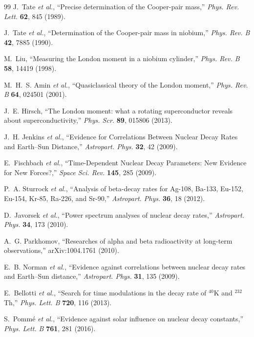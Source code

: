 \documentclass[aps,prb,twocolumn,superscriptaddress,floatfix,nofootinbib,longbibliography]{revtex4-2}
\begin{document}
\begin{thebibliography}{99}
J.~Tate \textit{et al.}, ``Precise determination of the Cooper-pair mass,''
\textit{Phys. Rev. Lett.} \textbf{62}, 845 (1989).

J.~Tate \textit{et al.}, ``Determination of the Cooper-pair mass in niobium,''
\textit{Phys. Rev. B} \textbf{42}, 7885 (1990).

M.~Liu, ``Measuring the London moment in a niobium cylinder,''
\textit{Phys. Rev. B} \textbf{58}, 14419 (1998).

M.~H.~S. Amin \textit{et al.}, ``Quasiclassical theory of the
London moment,'' \textit{Phys. Rev. B} \textbf{64}, 024501 (2001).

J.~E. Hirsch, ``The London moment: what a rotating superconductor
reveals about superconductivity,'' \textit{Phys. Scr.} \textbf{89},
015806 (2013).

J.~H. Jenkins \textit{et al.}, ``Evidence for Correlations Between Nuclear
Decay Rates and Earth--Sun Distance,'' \textit{Astropart. Phys.} \textbf{32},
42 (2009).

E.~Fischbach \textit{et al.}, ``Time-Dependent Nuclear Decay Parameters:
New Evidence for New Forces?,'' \textit{Space Sci. Rev.} \textbf{145},
285 (2009).

P.~A. Sturrock \textit{et al.}, ``Analysis of beta-decay rates for Ag-108,
Ba-133, Eu-152, Eu-154, Kr-85, Ra-226, and Sr-90,'' \textit{Astropart. Phys.}
\textbf{36}, 18 (2012).

D.~Javorsek \textit{et al.}, ``Power spectrum analyses of nuclear decay
rates,'' \textit{Astropart. Phys.} \textbf{34}, 173 (2010).

A.~G. Parkhomov, ``Researches of alpha and beta radioactivity at
long-term observations,'' arXiv:1004.1761 (2010).

E.~B. Norman \textit{et al.}, ``Evidence against correlations between
nuclear decay rates and Earth--Sun distance,'' \textit{Astropart. Phys.}
\textbf{31}, 135 (2009).

E.~Bellotti \textit{et al.}, ``Search for time modulations in the decay
rate of $^{40}$K and $^{232}$Th,'' \textit{Phys. Lett. B} \textbf{720},
116 (2013).

S.~Pomm\'e \textit{et al.}, ``Evidence against solar influence on nuclear
decay constants,'' \textit{Phys. Lett. B} \textbf{761}, 281 (2016).


\end{thebibliography}
\end{document}
